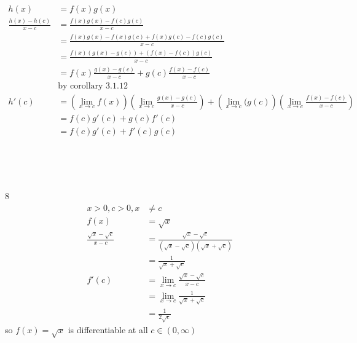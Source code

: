 \documentclass[12pt, border = 4pt, multi]{article} %
\begin{document}
\begin{align*}
h(x) &= f(x) g(x)\\
\frac{h(x) - h(c)}{x - c} &= \frac{f(x)g(x) - f(c)g(c)}{x - c}\\
&= \frac{f(x)g(x) - f(x)g(c) + f(x)g(c) - f(c)g(c)}{x - c}\\
&= \frac{f(x)(g(x) - g(c)) + (f(x) - f(c))g(c)}{x - c}\\
&= f(x)\frac{g(x) - g(c)}{x - c} + g(c)\frac{f(x) - f(c)}{x - c}\\
&\text{by corollary 3.1.12}\\
h'(c) &= \left(\lim_{x \rightarrow c}f(x)\right)\left(\lim_{x \rightarrow c}\frac{g(x) - g(c)}{x - c}\right) + \left(\lim_{x \rightarrow c}(g(c)\right)\left(\lim_{x \rightarrow c}\frac{f(x) - f(c)}{x - c}\right)\\
&= f(c)g'(c) + g(c)f'(c)\\
&= f(c)g'(c) + f'(c)g(c)\\
\end{align*}
\\
\\
\\
\\
8
\begin{align*}
x > 0, c > 0, x &\not= c\\
f(x) &= \sqrt{x}\\
\frac{\sqrt{x} - \sqrt{c}}{x - c} &= \frac{\sqrt{x} - \sqrt{c}}{(\sqrt{x} - \sqrt{c})(\sqrt{x} + \sqrt{c})}\\
&= \frac{1}{\sqrt{x} + \sqrt{c}}\\
f'(c) &= \lim_{x \rightarrow c}\frac{\sqrt{x} - \sqrt{c}}{x - c}\\
&= \lim_{x \rightarrow c}\frac{1}{\sqrt{x} + \sqrt{c}}\\
&= \frac{1}{2\sqrt{c}}
\end{align*}
so $f(x) = \sqrt{x}$ is differentiable at all $c \in (0, \infty)$\\
\end{document}
